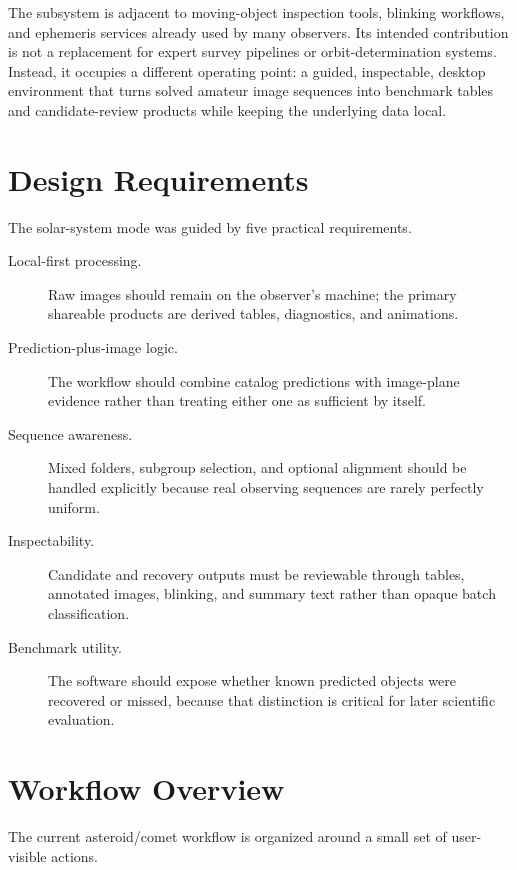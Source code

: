 \documentclass[modern]{aastex701}
\begin{document}
The subsystem is adjacent to moving-object inspection tools, blinking workflows, and ephemeris services already used by many observers. Its intended contribution is not a replacement for expert survey pipelines or orbit-determination systems. Instead, it occupies a different operating point: a guided, inspectable, desktop environment that turns solved amateur image sequences into benchmark tables and candidate-review products while keeping the underlying data local.

\section{Design Requirements}\label{sec:requirements}

The solar-system mode was guided by five practical requirements.

\begin{description}
\item[Local-first processing.] Raw images should remain on the observer's machine; the primary shareable products are derived tables, diagnostics, and animations.
\item[Prediction-plus-image logic.] The workflow should combine catalog predictions with image-plane evidence rather than treating either one as sufficient by itself.
\item[Sequence awareness.] Mixed folders, subgroup selection, and optional alignment should be handled explicitly because real observing sequences are rarely perfectly uniform.
\item[Inspectability.] Candidate and recovery outputs must be reviewable through tables, annotated images, blinking, and summary text rather than opaque batch classification.
\item[Benchmark utility.] The software should expose whether known predicted objects were recovered or missed, because that distinction is critical for later scientific evaluation.
\end{description}

\section{Workflow Overview}\label{sec:overview}

The current asteroid/comet workflow is organized around a small set of user-visible actions.
\end{document}
